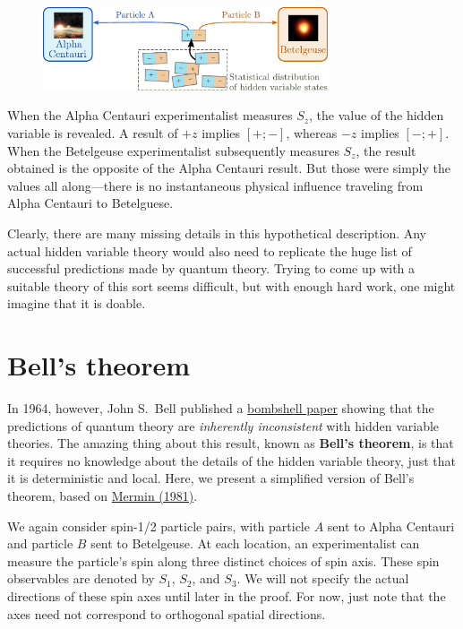 \documentclass[pra,12pt]{revtex4}
\begin{document}
\begin{figure}[h]
  \centering\includegraphics[width=0.75\textwidth]{hiddenvariables}
\end{figure}

When the Alpha Centauri experimentalist measures $S_z$, the value of
the hidden variable is revealed.  A result of $+z$ implies $[+;-]$,
whereas $-z$ implies $[-;+]$.  When the Betelgeuse experimentalist
subsequently measures $S_z$, the result obtained is the opposite of
the Alpha Centauri result.  But those were simply the values all
along---there is no instantaneous physical influence traveling from
Alpha Centauri to Betelguese.

Clearly, there are many missing details in this hypothetical
description.  Any actual hidden variable theory would also need to
replicate the huge list of successful predictions made by quantum
theory.  Trying to come up with a suitable theory of this sort seems
difficult, but with enough hard work, one might imagine that it is
doable.

\section{Bell's theorem}

In 1964, however, John S.~Bell published a
\hyperref[cite:bell]{bombshell paper} showing that the predictions of
quantum theory are \textit{inherently inconsistent} with hidden
variable theories.  The amazing thing about this result, known as
\textbf{Bell's theorem}, is that it requires no knowledge about the
details of the hidden variable theory, just that it is deterministic
and local.  Here, we present a simplified version of Bell's theorem,
based on \hyperref[cite:mermin]{Mermin (1981)}.

We again consider spin-1/2 particle pairs, with particle $A$ sent to
Alpha Centauri and particle $B$ sent to Betelgeuse.  At each location,
an experimentalist can measure the particle's spin along three
distinct choices of spin axis.  These spin observables are denoted by
$S_1$, $S_2$, and $S_3$.  We will not specify the actual directions of
these spin axes until later in the proof.  For now, just note that the
axes need not correspond to orthogonal spatial directions.
\end{document}
